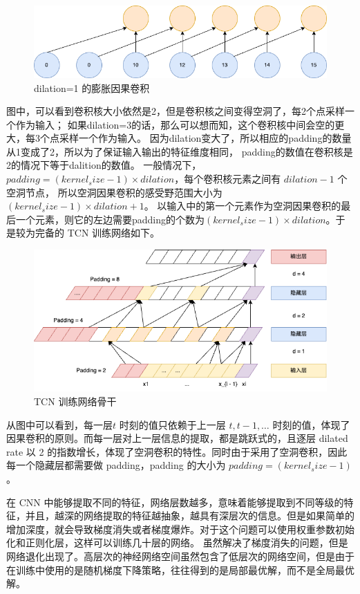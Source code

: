 \begin{figure}[htbp]
  \centering
  \includegraphics[width=\textwidth]{figures/dilation_convolution.drawio.png}
  \caption{dilation=1 的膨胀因果卷积}
\end{figure}

图中，可以看到卷积核大小依然是2，但是卷积核之间变得空洞了，每2个点采样一个作为输入；
如果dilation=3的话，那么可以想而知，这个卷积核中间会空的更大，每3个点采样一个作为输入。
因为dilation变大了，所以相应的padding的数量从1变成了2，所以为了保证输入输出的特征维度相同，
padding的数值在卷积核是2的情况下等于dalition的数值。
一般情况下，$padding=(kernel_size-1)\times dilation$，每个卷积核元素之间有 $dilation - 1$ 个空洞节点，
所以空洞因果卷积的感受野范围大小为 $(kernel_size-1) \times dilation + 1$。
以输入中的第一个元素作为空洞因果卷积的最后一个元素，则它的左边需要padding的个数为$(kernel_size-1) \times dilation$。于是较为完备的 TCN 训练网络如下。

\begin{figure}[htbp]
  \centering
  \includegraphics[width=\textwidth]{figures/tcn_1.drawio.png}
  \caption{TCN 训练网络骨干}
\end{figure}

从图中可以看到，每一层$t$ 时刻的值只依赖于上一层 $t, t - 1, \dots$ 时刻的值，体现了因果卷积的原则。而每一层对上一层信息的提取，都是跳跃式的，且逐层 dilated rate 以 2 的指数增长，体现了空洞卷积的特性。同时由于采用了空洞卷积，因此每一个隐藏层都需要做 padding，padding 的大小为 $padding = (kernel_size - 1)$。

在 CNN 中能够提取不同的特征，网络层数越多，意味着能够提取到不同等级的特征，并且，越深的网络提取的特征越抽象，越具有深层次的信息。但是如果简单的增加深度，就会导致梯度消失或者梯度爆炸。对于这个问题可以使用权重参数初始化和正则化层，这样可以训练几十层的网络\cite{吕国豪2014基于卷积神经网络的正则化方法}。
虽然解决了梯度消失的问题，但是网络退化出现了。高层次的神经网络空间虽然包含了低层次的网络空间，但是由于在训练中使用的是随机梯度下降策略，往往得到的是局部最优解，而不是全局最优解。

